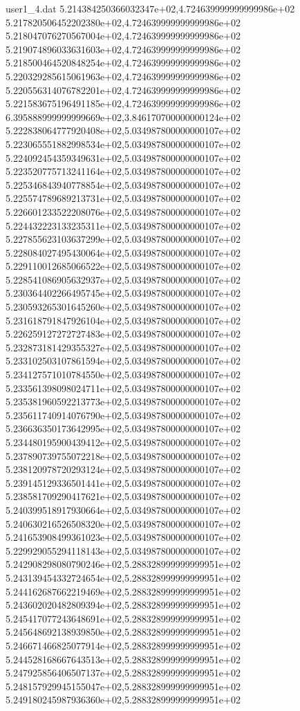 \begin{filecontents}{user1_4.dat}
5.214384250366032347e+02,4.724639999999999986e+02
5.217820506452202380e+02,4.724639999999999986e+02
5.218047076270567004e+02,4.724639999999999986e+02
5.219074896033631603e+02,4.724639999999999986e+02
5.218500464520848254e+02,4.724639999999999986e+02
5.220329285615061963e+02,4.724639999999999986e+02
5.220556314076782201e+02,4.724639999999999986e+02
5.221583675196491185e+02,4.724639999999999986e+02
6.395888999999999669e+02,3.846170700000000124e+02
5.222838064777920408e+02,5.034987800000000107e+02
5.223065551882998534e+02,5.034987800000000107e+02
5.224092454359349631e+02,5.034987800000000107e+02
5.223520775713241164e+02,5.034987800000000107e+02
5.225346843940778854e+02,5.034987800000000107e+02
5.225574789689213731e+02,5.034987800000000107e+02
5.226601233522208076e+02,5.034987800000000107e+02
5.224432223133235311e+02,5.034987800000000107e+02
5.227855623103637299e+02,5.034987800000000107e+02
5.228084027495430064e+02,5.034987800000000107e+02
5.229110012685066522e+02,5.034987800000000107e+02
5.228541086905632937e+02,5.034987800000000107e+02
5.230364402266495745e+02,5.034987800000000107e+02
5.230593265301645260e+02,5.034987800000000107e+02
5.231618791847926104e+02,5.034987800000000107e+02
5.226259127272727483e+02,5.034987800000000107e+02
5.232873181429355327e+02,5.034987800000000107e+02
5.233102503107861594e+02,5.034987800000000107e+02
5.234127571010784550e+02,5.034987800000000107e+02
5.233561398098024711e+02,5.034987800000000107e+02
5.235381960592213773e+02,5.034987800000000107e+02
5.235611740914076790e+02,5.034987800000000107e+02
5.236636350173642995e+02,5.034987800000000107e+02
5.234480195900439412e+02,5.034987800000000107e+02
5.237890739755072218e+02,5.034987800000000107e+02
5.238120978720293124e+02,5.034987800000000107e+02
5.239145129336501441e+02,5.034987800000000107e+02
5.238581709290417621e+02,5.034987800000000107e+02
5.240399518917930664e+02,5.034987800000000107e+02
5.240630216526508320e+02,5.034987800000000107e+02
5.241653908499361023e+02,5.034987800000000107e+02
5.229929055294118143e+02,5.034987800000000107e+02
5.242908298080790246e+02,5.288328999999999951e+02
5.243139454332724654e+02,5.288328999999999951e+02
5.244162687662219469e+02,5.288328999999999951e+02
5.243602020482809394e+02,5.288328999999999951e+02
5.245417077243648691e+02,5.288328999999999951e+02
5.245648692138939850e+02,5.288328999999999951e+02
5.246671466825077914e+02,5.288328999999999951e+02
5.244528168667643513e+02,5.288328999999999951e+02
5.247925856406507137e+02,5.288328999999999951e+02
5.248157929945155047e+02,5.288328999999999951e+02
5.249180245987936360e+02,5.288328999999999951e+02

\end{filecontents}

